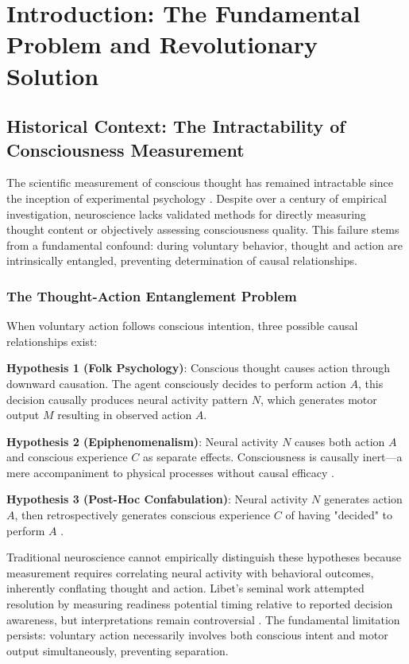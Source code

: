 \documentclass[11pt,onecolumn]{article}
\begin{document}
\clearpage
\tableofcontents
\clearpage

\section{Introduction: The Fundamental Problem and Revolutionary Solution}

\subsection{Historical Context: The Intractability of Consciousness Measurement}

The scientific measurement of conscious thought has remained intractable since the inception of experimental psychology \citep{james1890principles}. Despite over a century of empirical investigation, neuroscience lacks validated methods for directly measuring thought content or objectively assessing consciousness quality. This failure stems from a fundamental confound: during voluntary behavior, thought and action are intrinsically entangled, preventing determination of causal relationships.

\subsubsection{The Thought-Action Entanglement Problem}

When voluntary action follows conscious intention, three possible causal relationships exist:

\textbf{Hypothesis 1 (Folk Psychology)}: Conscious thought causes action through downward causation. The agent consciously decides to perform action $A$, this decision causally produces neural activity pattern $N$, which generates motor output $M$ resulting in observed action $A$.

\textbf{Hypothesis 2 (Epiphenomenalism)}: Neural activity $N$ causes both action $A$ and conscious experience $C$ as separate effects. Consciousness is causally inert---a mere accompaniment to physical processes without causal efficacy \citep{huxley1874hypothesis}.

\textbf{Hypothesis 3 (Post-Hoc Confabulation)}: Neural activity $N$ generates action $A$, then retrospectively generates conscious experience $C$ of having "decided" to perform $A$ \citep{wegner2002illusion}.

Traditional neuroscience cannot empirically distinguish these hypotheses because measurement requires correlating neural activity with behavioral outcomes, inherently conflating thought and action. Libet's seminal work \citep{libet1983time} attempted resolution by measuring readiness potential timing relative to reported decision awareness, but interpretations remain controversial \citep{schurger2012accumulator,maoz2019neural}. The fundamental limitation persists: voluntary action necessarily involves both conscious intent and motor output simultaneously, preventing separation.
\end{document}
